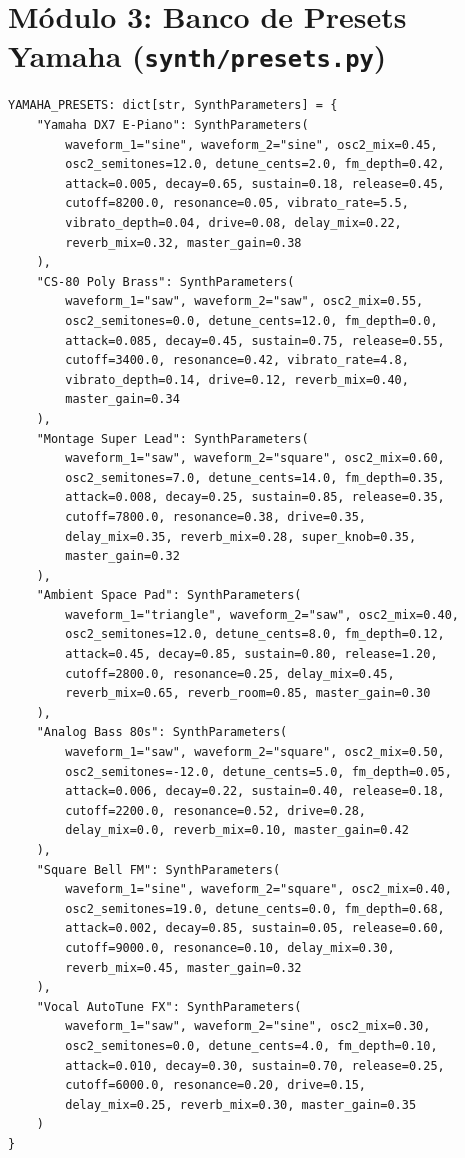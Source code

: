 \documentclass[11pt,a4paper]{article}
\begin{document}
\section{Módulo 3: Banco de Presets Yamaha (\texttt{synth/presets.py})}

\begin{lstlisting}
YAMAHA_PRESETS: dict[str, SynthParameters] = {
    "Yamaha DX7 E-Piano": SynthParameters(
        waveform_1="sine", waveform_2="sine", osc2_mix=0.45,
        osc2_semitones=12.0, detune_cents=2.0, fm_depth=0.42,
        attack=0.005, decay=0.65, sustain=0.18, release=0.45,
        cutoff=8200.0, resonance=0.05, vibrato_rate=5.5,
        vibrato_depth=0.04, drive=0.08, delay_mix=0.22,
        reverb_mix=0.32, master_gain=0.38
    ),
    "CS-80 Poly Brass": SynthParameters(
        waveform_1="saw", waveform_2="saw", osc2_mix=0.55,
        osc2_semitones=0.0, detune_cents=12.0, fm_depth=0.0,
        attack=0.085, decay=0.45, sustain=0.75, release=0.55,
        cutoff=3400.0, resonance=0.42, vibrato_rate=4.8,
        vibrato_depth=0.14, drive=0.12, reverb_mix=0.40,
        master_gain=0.34
    ),
    "Montage Super Lead": SynthParameters(
        waveform_1="saw", waveform_2="square", osc2_mix=0.60,
        osc2_semitones=7.0, detune_cents=14.0, fm_depth=0.35,
        attack=0.008, decay=0.25, sustain=0.85, release=0.35,
        cutoff=7800.0, resonance=0.38, drive=0.35,
        delay_mix=0.35, reverb_mix=0.28, super_knob=0.35,
        master_gain=0.32
    ),
    "Ambient Space Pad": SynthParameters(
        waveform_1="triangle", waveform_2="saw", osc2_mix=0.40,
        osc2_semitones=12.0, detune_cents=8.0, fm_depth=0.12,
        attack=0.45, decay=0.85, sustain=0.80, release=1.20,
        cutoff=2800.0, resonance=0.25, delay_mix=0.45,
        reverb_mix=0.65, reverb_room=0.85, master_gain=0.30
    ),
    "Analog Bass 80s": SynthParameters(
        waveform_1="saw", waveform_2="square", osc2_mix=0.50,
        osc2_semitones=-12.0, detune_cents=5.0, fm_depth=0.05,
        attack=0.006, decay=0.22, sustain=0.40, release=0.18,
        cutoff=2200.0, resonance=0.52, drive=0.28,
        delay_mix=0.0, reverb_mix=0.10, master_gain=0.42
    ),
    "Square Bell FM": SynthParameters(
        waveform_1="sine", waveform_2="square", osc2_mix=0.40,
        osc2_semitones=19.0, detune_cents=0.0, fm_depth=0.68,
        attack=0.002, decay=0.85, sustain=0.05, release=0.60,
        cutoff=9000.0, resonance=0.10, delay_mix=0.30,
        reverb_mix=0.45, master_gain=0.32
    ),
    "Vocal AutoTune FX": SynthParameters(
        waveform_1="saw", waveform_2="sine", osc2_mix=0.30,
        osc2_semitones=0.0, detune_cents=4.0, fm_depth=0.10,
        attack=0.010, decay=0.30, sustain=0.70, release=0.25,
        cutoff=6000.0, resonance=0.20, drive=0.15,
        delay_mix=0.25, reverb_mix=0.30, master_gain=0.35
    )
}
\end{lstlisting}
\end{document}
